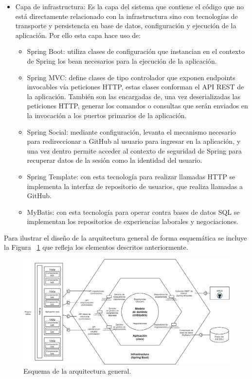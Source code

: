 \documentclass[a4paper, 12pt]{book}
\begin{document}
\begin{itemize}
  \item Capa de infrastructura: Es la capa del sistema que contiene el código que no está directamente relacionado con la infrastructura sino con tecnologías de transporte y persistencia en base de datos, configuración y ejecución de la aplicación. 
Por ello esta capa hace uso de:

	\begin{itemize}
	\item Spring Boot: utiliza clases de configuración que instancian en el contexto de Spring los bean necesarios para la ejecución de la aplicación.
	\item Spring MVC: define clases de tipo controlador que exponen endpoints invocables vía peticiones HTTP, estas clases conforman el API REST de la aplicación. También son las encargadas de, una vez deserializadas las peticiones HTTP, generar los comandos o consultas que serán enviados en la invocación a los puertos primarios de la aplicación.
	\item Spring Social: mediante configuración, levanta el mecanismo necesario para redireccionar a GitHub al usuario para ingresar en la aplicación, y una vez dentro permite acceder al contexto de seguridad de Spring para recuperar datos de la sesión como la identidad del usuario.
	\item Spring Template: con esta tecnología para realizar llamadas HTTP se implementa la interfaz de repositorio de usuarios, que realiza llamadas a GitHub.
	\item MyBatis: con esta tecnología para operar contra bases de datos SQL se implementan los repositorios de experiencias laborales y negociaciones.
	\end{itemize}
  
\end{itemize}


Para ilustrar el diseño de la arquitectura general de forma esquemática se incluye la Figura ~\ref{fig:general_architecture} que refleja los elementos descritos anteriormente.

\begin{figure}
  \centering
  \includegraphics[width=15cm, keepaspectratio]{img/Arquitectura_hexagonal.png}
  \caption{Esquema de la arquitectura general.}\label{fig:general_architecture}
\end{figure}
\end{document}
